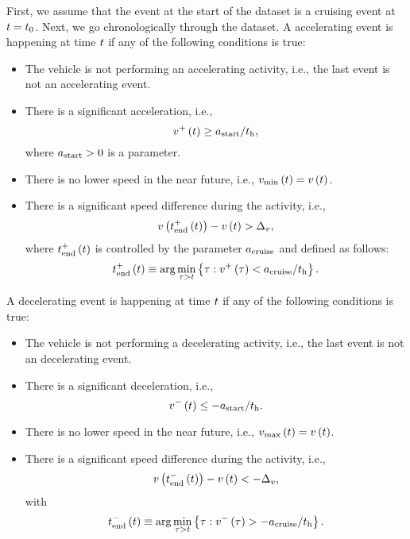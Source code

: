 First, we assume that the event at the start of the dataset is a cruising event at $t=t_{0}$. Next, we go chronologically through the dataset. A accelerating event is happening at time $t$ if any of the following conditions is true:
\begin{itemize}
	\item The vehicle is not performing an accelerating activity, i.e., the last event is not an accelerating event.
	\item There is a significant acceleration, i.e., 
	\begin{equation}
		v^{+}\left(t\right) \geq a_\mathrm{start} / t_{\mathrm{h}},
	\end{equation}
	where $a_\mathrm{start}>0$ is a parameter.
	\item There is no lower speed in the near future, i.e., $v_{\mathrm{min}}\left(t\right)=v\left(t\right)$.
	\item There is a significant speed difference during the activity, i.e., 
	\begin{equation}
		v\left(t_{\mathrm{end}}^{+}\left(t\right)\right) - v\left(t\right) > \Delta_{v},
	\end{equation}
	where $t_{\mathrm{end}}^{+}\left(t\right)$ is controlled by the parameter $a_\mathrm{cruise}$ and defined as follows:
	\begin{equation}
		t_{\mathrm{end}}^{+}\left(t\right) \equiv \arg \min_{\tau > t} \left\{ \tau: v^{+}\left(\tau\right) < a_\mathrm{cruise}/t_{\mathrm{h}} \right\}.
	\end{equation}
\end{itemize}

A decelerating event is happening at time $t$ if any of the following conditions is true:
\begin{itemize}
	\item The vehicle is not performing a decelerating activity, i.e., the last event is not an decelerating event.
	\item There is a significant deceleration, i.e., 
	\begin{equation}
		v^{-}\left(t\right) \leq -a_\mathrm{start} / t_{\mathrm{h}}.
	\end{equation}
	\item There is no lower speed in the near future, i.e., $v_{\mathrm{max}}\left(t\right)=v\left(t\right)$.
	\item There is a significant speed difference during the activity, i.e., 
	\begin{equation}
		v\left(t_{\mathrm{end}}^{-}\left(t\right)\right) - v\left(t\right) < -\Delta_{v},
	\end{equation}
	with
	\begin{equation}
		t_{\mathrm{end}}^{-}\left(t\right) \equiv \arg \min_{\tau > t} \left\{ \tau: v^{-}\left(\tau\right) > -a_\mathrm{cruise}/t_{\mathrm{h}} \right\}.
	\end{equation}
\end{itemize}

